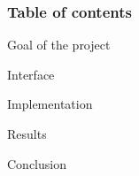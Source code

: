 \begin{frame}
	\frametitle{Table of contents}
	
	\begin{enumerate}
  		\Large{
  		\item Goal of the project
  		\vspace{0.25cm}
  		\item Interface
  		\vspace{0.25cm}
  		\item Implementation
  		\vspace{0.25cm}
  		\item Results
  		\vspace{0.25cm}
  		\item Conclusion
  		}
	\end{enumerate}

\end{frame}